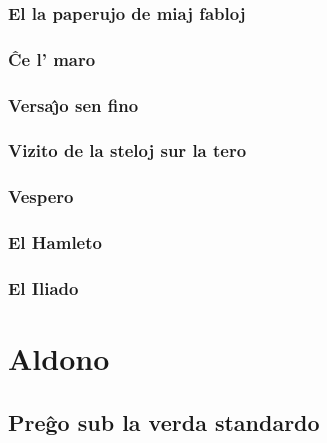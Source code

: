 \documentclass[a5paper,11pt,openany,twoside,leqno]{book}
\begin{document}
\subsection{El la paperujo de miaj fabloj}
\label{paperujo}


\subsection{\^Ce l' maro}
\label{maro}


\subsection{Versa\^{\j}o sen fino}
\label{senfino}

\subsection{Vizito de la steloj sur la tero}
\label{vizito}


\subsection{Vespero}
\label{vespero}


\newpage %

\subsection{El Hamleto}
\label{hamleto}


\subsection{El Iliado}
\label{iliado}


%
%
\chapter{Aldono}
\section{Pre\^go sub la verda standardo}
\label{standardo}


\newpage

%
%

\end{document}
